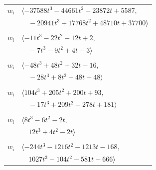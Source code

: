 \documentclass[11pt]{article}
\begin{document}
\begin{longtable}{@{}ll@{}}
$w_i$ & $\langle -37588t^{3}-44661t^{2}-23872t+5587,$\\
 & $\quad -20941t^{3}+17768t^{2}+48710t+37700\rangle$\\
\addlinespace[2pt]
\multicolumn{2}{@{}p{0.97\textwidth}@{}}{$i=31$, $D_i=2$, $\rho_{ij}$: $4{:}2, \allowbreak 7{:}1, \allowbreak 8{:}2, \allowbreak 12{:}1, \allowbreak 24{:}1, \allowbreak 30{:}1, \allowbreak 44{:}1, \allowbreak 55{:}2, \allowbreak 63{:}1$}\\
$w_i$ & $\langle -11t^{3}-22t^{2}-12t+2,$\\
 & $\quad -7t^{3}-9t^{2}+4t+3\rangle$\\
\addlinespace[2pt]
\multicolumn{2}{@{}p{0.97\textwidth}@{}}{$i=32$, $D_i=4$, $\rho_{ij}$: $7{:}1, \allowbreak 9{:}1, \allowbreak 12{:}2, \allowbreak 13{:}2, \allowbreak 14{:}2, \allowbreak 24{:}2, \allowbreak 29{:}1, \allowbreak 47{:}1, \allowbreak 49{:}1, \allowbreak 59{:}1, \allowbreak 60{:}2$}\\
$w_i$ & $\langle -48t^{3}+48t^{2}+32t-16,$\\
 & $\quad -28t^{3}+8t^{2}+48t-48\rangle$\\
\addlinespace[2pt]
\multicolumn{2}{@{}p{0.97\textwidth}@{}}{$i=33$, $D_i=8$, $\rho_{ij}$: $5{:}2, \allowbreak 7{:}2, \allowbreak 9{:}2, \allowbreak 15{:}2, \allowbreak 17{:}1, \allowbreak 19{:}2, \allowbreak 34{:}1, \allowbreak 35{:}2, \allowbreak 43{:}2, \allowbreak 52{:}2, \allowbreak 54{:}1$}\\
$w_i$ & $\langle 104t^{3}+205t^{2}+200t+93,$\\
 & $\quad -17t^{3}+209t^{2}+278t+181\rangle$\\
\addlinespace[2pt]
\multicolumn{2}{@{}p{0.97\textwidth}@{}}{$i=34$, $D_i=2$, $\rho_{ij}$: $4{:}2, \allowbreak 16{:}2, \allowbreak 33{:}2, \allowbreak 39{:}1, \allowbreak 46{:}1, \allowbreak 55{:}1$}\\
$w_i$ & $\langle 8t^{3}-6t^{2}-2t,$\\
 & $\quad 12t^{3}+4t^{2}-2t\rangle$\\
\addlinespace[2pt]
\multicolumn{2}{@{}p{0.97\textwidth}@{}}{$i=35$, $D_i=16$, $\rho_{ij}$: $3{:}2, \allowbreak 6{:}2, \allowbreak 7{:}2, \allowbreak 13{:}1, \allowbreak 15{:}2, \allowbreak 26{:}2, \allowbreak 33{:}1, \allowbreak 40{:}1, \allowbreak 53{:}1, \allowbreak 55{:}2, \allowbreak 56{:}1, \allowbreak 58{:}2, \allowbreak 62{:}2$}\\
$w_i$ & $\langle -244t^{3}-1216t^{2}-1213t-168,$\\
 & $\quad 1027t^{3}-104t^{2}-581t-666\rangle$\\

\end{longtable}
\end{document}

